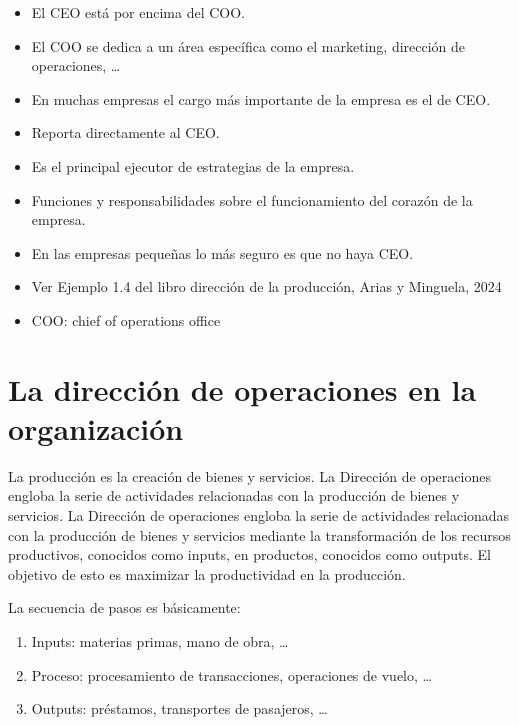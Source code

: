\documentclass[12pt]{report} %
\providecommand{\tightlist}{%
  \setlength{\itemsep}{0pt}\setlength{\parskip}{0pt}}
\begin{document}
\begin{itemize}
\tightlist
\item
  El CEO está por encima del COO.\\
\item
  El COO se dedica a un área específica como el marketing, dirección de
  operaciones, \ldots{}\\
\item
  En muchas empresas el cargo más importante de la empresa es el de
  CEO.\\
\item
  Reporta directamente al CEO.\\
\item
  Es el principal ejecutor de estrategias de la empresa.\\
\item
  Funciones y responsabilidades sobre el funcionamiento del corazón de
  la empresa.\\
\item
  En las empresas pequeñas lo más seguro es que no haya CEO.\\
\item
  Ver Ejemplo 1.4 del libro dirección de la producción, Arias y
  Minguela, 2024\\
\item
  COO: chief of operations office
\end{itemize}

\hypertarget{la-direcciuxf3n-de-operaciones-en-la-organizaciuxf3n}{%
\section{La dirección de operaciones en la
organización}\label{la-direcciuxf3n-de-operaciones-en-la-organizaciuxf3n}}

La producción es la creación de bienes y servicios. La Dirección de
operaciones engloba la serie de actividades relacionadas con la
producción de bienes y servicios. La Dirección de operaciones engloba la
serie de actividades relacionadas con la producción de bienes y
servicios mediante la transformación de los recursos productivos,
conocidos como inputs, en productos, conocidos como outputs. El objetivo
de esto es maximizar la productividad en la producción.

La secuencia de pasos es básicamente:

\begin{enumerate}
\def\labelenumi{\arabic{enumi}.}
\tightlist
\item
  Inputs: materias primas, mano de obra, \ldots{}\\
\item
  Proceso: procesamiento de transacciones, operaciones de vuelo,
  \ldots{}\\
\item
  Outputs: préstamos, transportes de pasajeros, \ldots{}
\end{enumerate}
\end{document}
